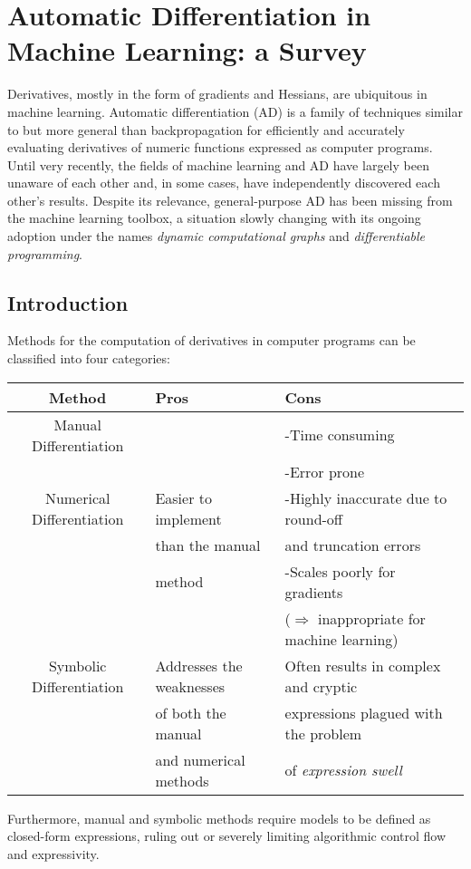 \section{Automatic Differentiation in Machine Learning: a Survey}
Derivatives, mostly in the form of gradients and Hessians, are ubiquitous in machine learning. Automatic differentiation (AD) is a family of techniques similar to but more general than backpropagation for efficiently and accurately evaluating derivatives of numeric functions expressed as computer programs. Until
very recently, the fields of machine learning and AD have largely been unaware of each other and, in some cases, have independently discovered each other’s results. Despite its relevance, general-purpose AD has been missing from the machine learning toolbox, a situation slowly changing with its ongoing adoption under the names \emph{dynamic computational graphs} and \emph{differentiable programming}.

\subsection{Introduction}
Methods for the computation of derivatives in computer programs can be classified into four categories:
\begin{center}
\begin{tabular}{ |c|l|l| } 
\hline
 Method & Pros & Cons\\
\hline
 Manual Differentiation & & -Time consuming \\ 
 & & -Error prone\\ \hline
 Numerical Differentiation& Easier to implement & -Highly inaccurate due to round-off\\
 & than the manual  & and truncation errors\\
 & method & -Scales poorly for gradients\\ 
 & & ($\Rightarrow$ inappropriate for machine learning) \\ \hline
 Symbolic Differentiation & Addresses the weaknesses & Often results in complex and cryptic  \\ 
 & of both the manual & expressions plagued with the problem \\ 
 & and  numerical methods & of \emph{expression swell}\\ \hline
\end{tabular}
\end{center}
\vspace{5mm}
\noindent Furthermore, manual and symbolic methods require models to be defined as closed-form expressions, ruling out or severely limiting algorithmic control flow and expressivity.
\newline 


